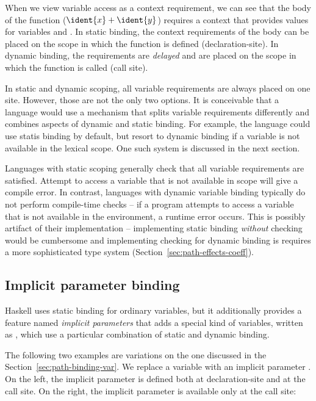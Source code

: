 \noindent
When we view variable access as a context requirement, we can see that the body of the function
($\ident{x}+\ident{y}$) requires a context that provides values for variables  and
. In static binding, the context requirements of the body can be placed on the scope in
which the function is defined (declaration-site). In dynamic binding, the requirements are
\emph{delayed} and are placed on the scope in which the function is called (call site).

In static and dynamic scoping, all variable requirements are always placed on one site. However,
those are not the only two options. It is conceivable that a language would use a mechanism that
splits variable requirements differently and combines aspects of dynamic and static binding. For
example, the language could use statis binding by default, but resort to dynamic binding if a
variable is not available in the lexical scope. One such system is discussed in the next section.

Languages with static scoping generally check that all variable requirements are satisfied.
Attempt to access a variable that is not available in scope will give a compile error. In contrast,
languages with dynamic variable binding typically do not perform compile-time checks -- if a
program attempts to access a variable that is not available in the environment, a runtime error
occurs. This is possibly artifact of their implementation -- implementing static binding
\emph{without} checking would be cumbersome and implementing checking for dynamic binding is
requires a more sophisticated type system (Section~\ref{sec:path-effects-coeff}).


\subsection{Implicit parameter binding}
\label{sec:path-binding-impl}

Haskell uses static binding for ordinary variables, but it additionally provides a feature named
\emph{implicit parameters} \cite{app-implicit-parameters} that adds a special kind of variables,
written as , which use a particular combination of static and dynamic binding.

The following two examples are variations on the one discussed in the Section~\ref{sec:path-binding-var}.
We replace a variable  with an implicit parameter . On the left, the
implicit parameter is defined both at declaration-site and at the call site. On the right, the
implicit parameter is available only at the call site:

